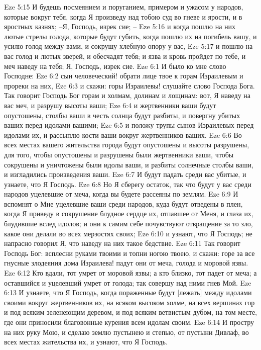 Eze 5:15  И будешь посмеянием и поруганием, примером и ужасом у народов, которые вокруг тебя, когда Я произведу над тобою суд во гневе и ярости, и в яростных казнях; --Я, Господь, изрек сие; --
Eze 5:16  и когда пошлю на них лютые стрелы голода, которые будут губить, когда пошлю их на погибель вашу, и усилю голод между вами, и сокрушу хлебную опору у вас,
Eze 5:17  и пошлю на вас голод и лютых зверей, и обесчадят тебя; и язва и кровь пройдет по тебе, и меч наведу на тебя; Я, Господь, изрек сие.
Eze 6:1  И было ко мне слово Господне:
Eze 6:2  сын человеческий! обрати лице твое к горам Израилевым и прореки на них,
Eze 6:3  и скажи: горы Израилевы! слушайте слово Господа Бога. Так говорит Господь Бог горам и холмам, долинам и лощинам: вот, Я наведу на вас меч, и разрушу высоты ваши;
Eze 6:4  и жертвенники ваши будут опустошены, столбы ваши в честь солнца будут разбиты, и повергну убитых ваших перед идолами вашими;
Eze 6:5  и положу трупы сынов Израилевых перед идолами их, и рассыплю кости ваши вокруг жертвенников ваших.
Eze 6:6  Во всех местах вашего жительства города будут опустошены и высоты разрушены, для того, чтобы опустошены и разрушены были жертвенники ваши, чтобы сокрушены и уничтожены были идолы ваши, и разбиты солнечные столбы ваши, и изгладились произведения ваши.
Eze 6:7  И будут падать среди вас убитые, и узнаете, что Я Господь.
Eze 6:8  Но Я сберегу остаток, так что будут у вас среди народов уцелевшие от меча, когда вы будете рассеяны по землям.
Eze 6:9  И вспомнят о Мне уцелевшие ваши среди народов, куда будут отведены в плен, когда Я приведу в сокрушение блудное сердце их, отпавшее от Меня, и глаза их, блудившие вслед идолов; и они к самим себе почувствуют отвращение за то зло, какое они делали во всех мерзостях своих;
Eze 6:10  и узнают, что Я Господь; не напрасно говорил Я, что наведу на них такое бедствие.
Eze 6:11  Так говорит Господь Бог: всплесни руками твоими и топни ногою твоею, и скажи: горе за все гнусные злодеяния дома Израилева! падут они от меча, голода и моровой язвы.
Eze 6:12  Кто вдали, тот умрет от моровой язвы; а кто близко, тот падет от меча; а оставшийся и уцелевший умрет от голода; так совершу над ними гнев Мой.
Eze 6:13  И узнаете, что Я Господь, когда пораженные будут [лежать] между идолами своими вокруг жертвенников их, на всяком высоком холме, на всех вершинах гор и под всяким зеленеющим деревом, и под всяким ветвистым дубом, на том месте, где они приносили благовонные курения всем идолам своим.
Eze 6:14  И простру на них руку Мою, и сделаю землю пустынею и степью, от пустыни Дивлаф, во всех местах жительства их, и узнают, что Я Господь.
